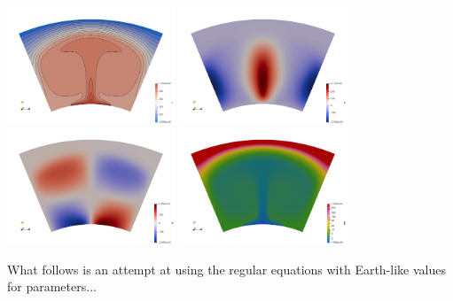 \includegraphics[width=5cm]{python_codes/fieldstone_106/results/exp3/nelr24/T}
\includegraphics[width=5cm]{python_codes/fieldstone_106/results/exp3/nelr24/vr}
\includegraphics[width=5cm]{python_codes/fieldstone_106/results/exp3/nelr24/vt}
\includegraphics[width=5cm]{python_codes/fieldstone_106/results/exp3/nelr24/eta}







\newpage
What follows is an attempt at using the regular equations with Earth-like values for parameters...

